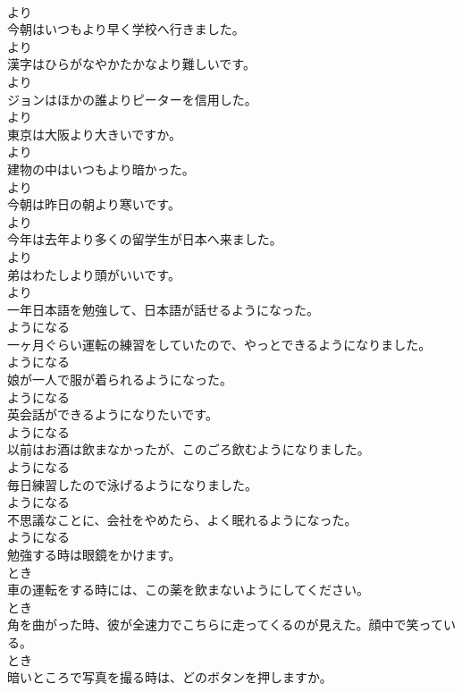 \documentclass[8pt]{extreport}
\begin{document}
\begin{CJK}{UTF8}{min}
\\	より
\\	今朝はいつもより早く学校へ行きました。	
\\	より
\\	漢字はひらがなやかたかなより難しいです。	
\\	より
\\	ジョンはほかの誰よりピーターを信用した。	
\\	より
\\	東京は大阪より大きいですか。	
\\	より
\\	建物の中はいつもより暗かった。	
\\	より
\\	今朝は昨日の朝より寒いです。	
\\	より
\\	今年は去年より多くの留学生が日本へ来ました。	
\\	より
\\	弟はわたしより頭がいいです。	
\\	より
\\	一年日本語を勉強して、日本語が話せるようになった。	
\\	ようになる
\\	一ヶ月ぐらい運転の練習をしていたので、やっとできるようになりました。	
\\	ようになる
\\	娘が一人で服が着られるようになった。	
\\	ようになる
\\	英会話ができるようになりたいです。	
\\	ようになる
\\	以前はお酒は飲まなかったが、このごろ飲むようになりました。	
\\	ようになる
\\	毎日練習したので泳げるようになりました。	
\\	ようになる
\\	不思議なことに、会社をやめたら、よく眠れるようになった。	
\\	ようになる
\\	勉強する時は眼鏡をかけます。	
\\	とき
\\	車の運転をする時には、この薬を飲まないようにしてください。	
\\	とき
\\	角を曲がった時、彼が全速力でこちらに走ってくるのが見えた。顔中で笑っている。	
\\	とき
\\	暗いところで写真を撮る時は、どのボタンを押しますか。	

\end{CJK}
\end{document}
